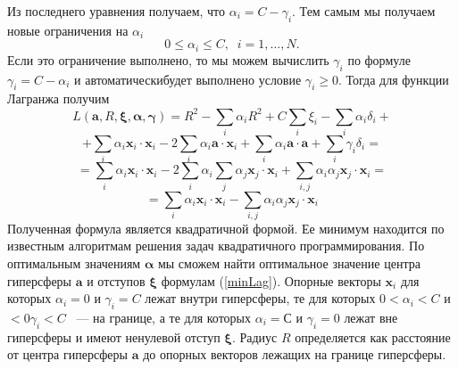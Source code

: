 \documentclass[12pt,a4paper]{amsart}
\newcommand\mb[1]{\ensuremath{\mathbf{#1}}}
\begin{document}
Из последнего уравнения получаем, что $\alpha_i = C - \gamma_i$. Тем самым мы получаем новые ограничения на $\alpha_i$ 
$$0\leq\alpha_i\leq C, \;\; i = 1,\ldots,N.$$
Если это ограничение выполнено, то мы можем вычислить $\gamma_i$ по формуле $\gamma_i = C - \alpha_i$ и автоматическибудет выполнено условие $\gamma_i\geq 0$.
Тогда для функции Лагранжа получим
$$L(\mb a, R,\mb{\xi},\mb{\alpha},\mb{\gamma})=R^2-\sum\limits_{i}\alpha_iR^2 + 
C\sum\limits_{i}\xi_i-\sum\limits_{i}\alpha_i\delta_i+$$
$$+\sum\limits_{i}\alpha_i\mb x_i\cdot\mb x_i-2\sum\limits_{i}\alpha_i\mb a\cdot\mb x_i+\sum\limits_{i}\alpha_i\mb a\cdot\mb a +\sum\limits_{i}\gamma_i\delta_i=$$ 
$$ = \sum\limits_{i}\alpha_i\mb x_i\cdot\mb x_i-
2 \sum\limits_{i}\alpha_i \sum\limits_{j} \alpha_j \mb x_j\cdot \mb x_i+\sum\limits_{i,j}\alpha_i\alpha_j \mb x_j\cdot \mb x_i=$$
$$=\sum\limits_{i}\alpha_i\mb x_i\cdot\mb x_i-\sum\limits_{i,j}\alpha_i\alpha_j\mb x_j\cdot\mb x_i$$
Полученная формула является квадратичной формой. Ее минимум находится по известным алгоритмам решения задач квадратичного программирования. По оптимальным значениям $\mb{\alpha}$ мы сможем найти оптимальное значение центра гиперсферы $\mb a$ и отступов $\mb{\xi}$  формулам (\ref{minLag}). Опорные векторы $\mb x_i$ для которых $\alpha_i=0$ и $\gamma_i=C$ лежат внутри гиперсферы, те для которых $0<\alpha_i<C$ и $<0\gamma_i<C$ ~--- на границе, а те для которых $\alpha_i=С$ и $\gamma_i=0$ лежат вне гиперсферы и имеют ненулевой отступ $\mb{\xi}$. Радиус $R$ определяется как расстояние от центра гиперсферы $\mb a$ до опорных векторов лежащих на границе гиперсферы.
\end{document}
